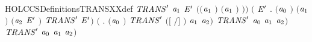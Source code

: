 \begin{SaveVerbatim}{HOLCCSDefinitionsTRANSXXdef}
                \ensuremath{\HOLBoundVar{TRANS}\sp{\prime{}}}  \ensuremath{\HOLBoundVar{a}\sb{\mathrm{1}}} \ensuremath{\HOLBoundVar{E}\sp{\prime{}}} \HOLSymConst{\HOLTokenConj{}}
                \ensuremath{(}\ensuremath{(}\ensuremath{\HOLBoundVar{a}\sb{\mathrm{1}}} \HOLSymConst{\ensuremath{=}} \HOLConst{\ensuremath{\tau}}\ensuremath{)} \HOLSymConst{\HOLTokenDisj{}} \ensuremath{(}\ensuremath{\HOLBoundVar{a}\sb{\mathrm{1}}} \HOLSymConst{\ensuremath{=}}  \ensuremath{)} \HOLSymConst{\HOLTokenConj{}}  \HOLConst{\HOLTokenNotIn{}}  \HOLSymConst{\HOLTokenConj{}}   \HOLConst{\HOLTokenNotIn{}} \ensuremath{)}\ensuremath{)} \HOLSymConst{\HOLTokenDisj{}}
             \ensuremath{(}\HOLSymConst{\HOLTokenExists{}}  \ensuremath{\HOLBoundVar{E}\sp{\prime{}}} .
                \ensuremath{(}\ensuremath{\HOLBoundVar{a}\sb{\mathrm{0}}} \HOLSymConst{\ensuremath{=}}   \ensuremath{)} \HOLSymConst{\HOLTokenConj{}} \ensuremath{(}\ensuremath{\HOLBoundVar{a}\sb{\mathrm{1}}} \HOLSymConst{\ensuremath{=}}   \ensuremath{)} \HOLSymConst{\HOLTokenConj{}}
                \ensuremath{(}\ensuremath{\HOLBoundVar{a}\sb{\mathrm{2}}} \HOLSymConst{\ensuremath{=}}  \ensuremath{\HOLBoundVar{E}\sp{\prime{}}} \ensuremath{)} \HOLSymConst{\HOLTokenConj{}} \ensuremath{\HOLBoundVar{TRANS}\sp{\prime{}}}   \ensuremath{\HOLBoundVar{E}\sp{\prime{}}}\ensuremath{)} \HOLSymConst{\HOLTokenDisj{}}
             \ensuremath{(}\HOLSymConst{\HOLTokenExists{}} .
                \ensuremath{(}\ensuremath{\HOLBoundVar{a}\sb{\mathrm{0}}} \HOLSymConst{\ensuremath{=}}   \ensuremath{)} \HOLSymConst{\HOLTokenConj{}} \ensuremath{\HOLBoundVar{TRANS}\sp{\prime{}}} \ensuremath{(}\ensuremath{[}  \ensuremath{/}\ensuremath{]} \ensuremath{)} \ensuremath{\HOLBoundVar{a}\sb{\mathrm{1}}} \ensuremath{\HOLBoundVar{a}\sb{\mathrm{2}}}\ensuremath{)} \HOLSymConst{\HOLTokenImp{}}
             \ensuremath{\HOLBoundVar{TRANS}\sp{\prime{}}} \ensuremath{\HOLBoundVar{a}\sb{\mathrm{0}}} \ensuremath{\HOLBoundVar{a}\sb{\mathrm{1}}} \ensuremath{\HOLBoundVar{a}\sb{\mathrm{2}}}\ensuremath{)} \HOLSymConst{\HOLTokenImp{}}
          \ensuremath{\HOLBoundVar{TRANS}\sp{\prime{}}} \ensuremath{\HOLBoundVar{a}\sb{\mathrm{0}}} \ensuremath{\HOLBoundVar{a}\sb{\mathrm{1}}} \ensuremath{\HOLBoundVar{a}\sb{\mathrm{2}}}\ensuremath{)}
\end{SaveVerbatim}
